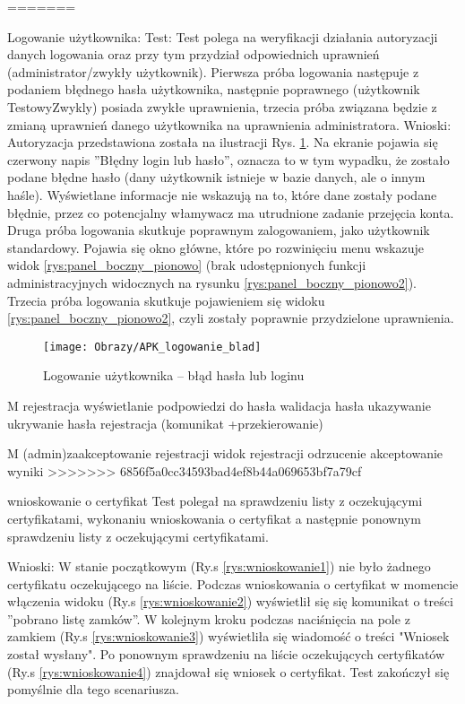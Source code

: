 \begin{enumerate*}
=======
	\item Logowanie użytkownika: \newline
	Test: Test polega na weryfikacji działania autoryzacji danych logowania oraz przy tym przydział odpowiednich uprawnień (administrator/zwykły użytkownik). Pierwsza próba logowania następuje z podaniem błędnego hasła użytkownika, następnie poprawnego (użytkownik TestowyZwykly) posiada zwykłe uprawnienia, trzecia próba związana będzie z zmianą uprawnień danego użytkownika na uprawnienia administratora.\newline
	Wnioski: Autoryzacja przedstawiona została na ilustracji Rys. \ref{rys:Logodwanie_blad_hasla}. Na ekranie pojawia się czerwony napis ''Błędny login lub hasło'', oznacza to w tym wypadku, że zostało podane błędne hasło (dany użytkownik istnieje w bazie danych, ale o innym haśle). Wyświetlane informacje nie wskazują na to, które dane zostały podane błędnie, przez co potencjalny włamywacz ma utrudnione zadanie przejęcia konta. Druga próba logowania skutkuje poprawnym zalogowaniem, jako użytkownik standardowy. Pojawia się okno główne, które po rozwinięciu menu wskazuje widok \ref{rys:panel_boczny_pionowo} (brak udostępnionych funkcji administracyjnych widocznych na rysunku \ref{rys:panel_boczny_pionowo2}). Trzecia próba logowania skutkuje pojawieniem się widoku \ref{rys:panel_boczny_pionowo2}, czyli zostały poprawnie przydzielone uprawnienia.
	
	\begin{figure}[ht!]
		\centering
		\texttt{[image: Obrazy/APK\_logowanie\_blad]}
		\caption{Logowanie użytkownika -- błąd hasła lub loginu}
		\label{rys:Logodwanie_blad_hasla}
	\end{figure}
	\item M rejestracja
	wyświetlanie podpowiedzi do hasła
	walidacja hasła 
	ukazywanie ukrywanie hasła
	rejestracja (komunikat +przekierowanie)
	\item M (admin)zaakceptowanie rejestracji
	widok rejestracji odrzucenie 
	akceptowanie wyniki
>>>>>>> 6856f5a0cc34593bad4ef8b44a069653bf7a79cf
	\item  wnioskowanie o certyfikat\newline
	Test polegał na sprawdzeniu listy z oczekującymi certyfikatami, wykonaniu wnioskowania o certyfikat a następnie ponownym sprawdzeniu listy z oczekującymi certyfikatami.
	
	Wnioski: W stanie początkowym (Ry.s \ref{rys:wnioskowanie1}) nie było żadnego certyfikatu oczekującego na liście. Podczas wnioskowania o certyfikat w momencie włączenia widoku (Ry.s \ref{rys:wnioskowanie2}) wyświetlił się  się komunikat o treści ''pobrano listę zamków''. W kolejnym kroku podczas naciśnięcia na pole z zamkiem (Ry.s \ref{rys:wnioskowanie3}) wyświetliła się wiadomość o treści "Wniosek został wysłany". Po ponownym sprawdzeniu na liście oczekujących certyfikatów (Ry.s \ref{rys:wnioskowanie4}) znajdował się wniosek o certyfikat. Test zakończył się pomyślnie dla tego scenariusza.
	

\end{enumerate*}
